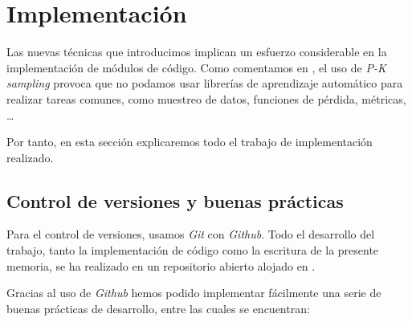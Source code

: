 \chapter{Implementación} \label{ich:implementacion}

Las nuevas técnicas que introducimos implican un esfuerzo considerable en la implementación de módulos de código. Como comentamos en , el uso de \textit{P-K sampling} provoca que no podamos usar librerías de aprendizaje automático para realizar tareas comunes, como muestreo de datos, funciones de pérdida, métricas, \ldots

Por tanto, en esta sección explicaremos todo el trabajo de implementación realizado.

\section{Control de versiones y buenas prácticas}

Para el control de versiones, usamos \textit{Git} con \textit{Github}. Todo el desarrollo del trabajo, tanto la implementación de código como la escritura de la presente memoria, se ha realizado en un repositorio abierto alojado en \cite{informatica:repogithub}.

Gracias al uso de \textit{Github} hemos podido implementar fácilmente una serie de buenas prácticas de desarrollo, entre las cuales se encuentran:

